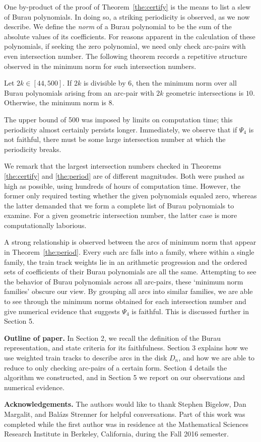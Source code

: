 One by-product of the proof of Theorem~\ref{the:certify} is the means to list a slew of Burau polynomials. In doing so, a striking periodicity is observed, as we now describe. We define the \emph{norm} of a Burau polynomial to be the sum of the absolute values of its coefficients. For reasons apparent in the calculation of these polynomials, if seeking the zero polynomial, we need only check arc-pairs with even intersection number. The following theorem records a repetitive structure observed in the minimum norm for such intersection numbers.

\begin{maintheorem}\label{the:period}Let $2k \in [44, 500]$. If $2k$ is divisible by $6$, then the minimum norm over all Burau polynomials arising from an arc-pair with $2k$ geometric intersections is $10$. Otherwise, the minimum norm is $8$.\end{maintheorem}

The upper bound of 500 was imposed by limits on computation time; this periodicity almost certainly persists longer. Immediately, we observe that if $\Psi_4$ is not faithful, there must be some large intersection number at which the periodicity breaks.

We remark that the largest intersection numbers checked in Theorems \ref{the:certify} and \ref{the:period} are of different magnitudes. Both were pushed as high as possible, using hundreds of hours of computation time. However, the former only required testing whether the given polynomials equaled zero, whereas the latter demanded that we form a complete list of Burau polynomials to examine. For a given geometric intersection number, the latter case is more computationally laborious.

A strong relationship is observed between the arcs of minimum norm that appear in Theorem~\ref{the:period}. Every such arc falls into a family, where within a single family, the train track weights lie in an arithmetic progression and the ordered sets of coefficients of their Burau polynomials are all the same. Attempting to see the behavior of Burau polynomials across all arc-pairs, these `minimum norm families' obscure our view. By grouping all arcs into similar families, we are able to see through the minimum norms obtained for each intersection number and give numerical evidence that suggests $\Psi_4$ is faithful. This is discussed further in Section 5.

\textbf{Outline of paper.} In Section 2, we recall the definition of the Burau representation, and state criteria for its faithfulness. Section 3 explains how we use weighted train tracks to describe arcs in the disk $D_n$, and how we are able to reduce to only checking arc-pairs of a certain form. Section 4 details the algorithm we constructed, and in Section 5 we report on our observations and numerical evidence.

\textbf{Acknowledgements.} The authors would like to thank Stephen Bigelow, Dan Margalit, and Bal\'azs Strenner for helpful conversations. Part of this work was completed while the first author was in residence at the Mathematical Sciences Research Institute in Berkeley, California, during the Fall 2016 semester.